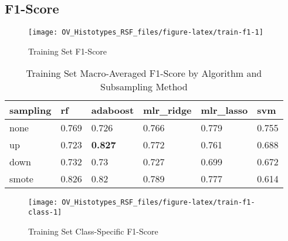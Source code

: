 \documentclass[
]{report}
\begin{document}
\hypertarget{f1-score}{%
\subsection{F1-Score}\label{f1-score}}

\begin{figure}[H]

{\centering \texttt{[image: OV\_Histotypes\_RSF\_files/figure-latex/train-f1-1]} 

}

\caption{Training Set F1-Score}\label{fig:train-f1}
\end{figure}

\begin{table}

\caption{\label{tab:train-f1-table}Training Set Macro-Averaged F1-Score by Algorithm and Subsampling Method}
\centering
\begin{tabular}[t]{l|l|l|l|l|l}
\hline
sampling & rf & adaboost & mlr\_ridge & mlr\_lasso & svm\\
\hline
none & 0.769 & 0.726 & 0.766 & 0.779 & 0.755\\
\hline
up & 0.723 & \textbf{0.827} & 0.772 & 0.761 & 0.688\\
\hline
down & 0.732 & 0.73 & 0.727 & 0.699 & 0.672\\
\hline
smote & 0.826 & 0.82 & 0.789 & 0.777 & 0.614\\
\hline
\end{tabular}
\end{table}

\begin{figure}[H]

{\centering \texttt{[image: OV\_Histotypes\_RSF\_files/figure-latex/train-f1-class-1]} 

}

\caption{Training Set Class-Specific F1-Score}\label{fig:train-f1-class}
\end{figure}
\end{document}
